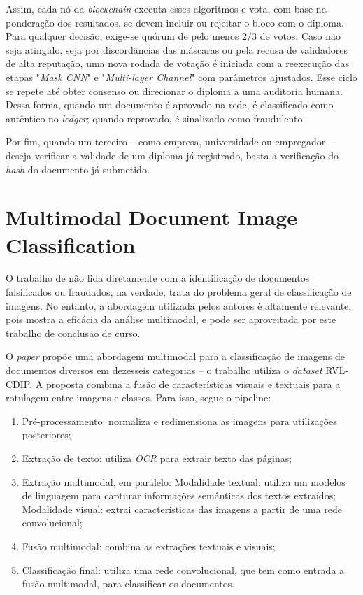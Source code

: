 Assim, cada nó da \textit{blockchain} executa esses algoritmos e vota, com base na ponderação dos resultados, se devem incluir ou rejeitar o bloco com o diploma. Para qualquer decisão, exige-se quórum de pelo menos $2/3$ de votos. Caso não seja atingido, seja por discordâncias das máscaras ou pela recusa de validadores de alta reputação, uma nova rodada de votação é iniciada com a reexecução das etapas "\textit{Mask CNN}" e "\textit{Multi-layer Channel}" com parâmetros ajustados. Esse ciclo se repete até obter consenso ou direcionar o diploma a uma auditoria humana. Dessa forma, quando um documento é aprovado na rede, é classificado como autêntico no \textit{ledger}; quando reprovado, é sinalizado como fraudulento.

Por fim, quando um terceiro -- como empresa, universidade ou empregador -- deseja verificar a validade de um diploma já registrado, basta a verificação do \textit{hash} do documento já submetido.

\section{Multimodal Document Image Classification}

O trabalho de \citeauthor*{multimodal} \cite*{multimodal} não lida diretamente com a identificação de documentos falsificados ou fraudados, na verdade, trata do problema geral de classificação de imagens. No entanto, a abordagem utilizada pelos autores é altamente relevante, pois mostra a eficácia da análise multimodal, e pode ser aproveitada por este trabalho de conclusão de curso.

O \textit{paper} propõe uma abordagem multimodal para a classificação de imagens de documentos diversos em dezesseis categorias -- o trabalho utiliza o \textit{dataset} RVL-CDIP. A proposta combina a fusão de características visuais e textuais para a rotulagem entre imagens e classes. Para isso, segue o pipeline:

\begin{enumerate}
    \item Pré-processamento: normaliza e redimensiona as imagens para utilizações posteriores;
    \item Extração de texto: utiliza \textit{OCR} para extrair texto das páginas;
    \item Extração multimodal, em paralelo:
    \subitem Modalidade textual: utiliza um modelos de linguagem para capturar informações semânticas dos textos extraídos;
    \subitem Modalidade visual: extrai características das imagens a partir de uma rede convolucional;
    \item Fusão multimodal: combina as extrações textuais e visuais;
    \item Classificação final: utiliza uma rede convolucional, que tem como entrada a fusão multimodal, para classificar os documentos.
\end{enumerate}


